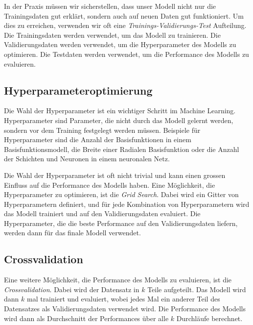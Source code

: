 In der Praxis müssen wir sicherstellen, dass unser Modell nicht nur die Trainingsdaten
gut erklärt, sondern auch auf neuen Daten gut funktioniert.
Um dies zu erreichen, verwenden wir oft eine \emph{Trainings-Validierungs-Test} Aufteilung.
Die Trainingsdaten werden verwendet, um das Modell zu trainieren. Die Validierungsdaten
werden verwendet, um die Hyperparameter des Modells zu optimieren. Die Testdaten werden
verwendet, um die Performance des Modells zu evaluieren.

\subsection{Hyperparameteroptimierung}
Die Wahl der Hyperparameter ist ein wichtiger Schritt im Machine Learning.
Hyperparameter sind Parameter, die nicht durch das Modell gelernt werden, sondern
vor dem Training festgelegt werden müssen. Beispiele für Hyperparameter sind die
Anzahl der Basisfunktionen in einem Basisfunktionsmodell, die Breite einer Radialen 
Basisfunktion oder die Anzahl der Schichten und Neuronen in einem neuronalen Netz.

Die Wahl der Hyperparameter ist oft nicht trivial und kann einen grossen Einfluss auf die
Performance des Modells haben. Eine Möglichkeit, die Hyperparameter zu optimieren, ist
die \emph{Grid Search}. Dabei wird ein Gitter von Hyperparametern definiert, und für
jede Kombination von Hyperparametern wird das Modell trainiert und auf den Validierungsdaten
evaluiert. Die Hyperparameter, die die beste Performance auf den Validierungsdaten liefern,
werden dann für das finale Modell verwendet.

\subsection{Crossvalidation} \label{ML-Crossval}
Eine weitere Möglichkeit, die Performance des Modells zu evaluieren, ist die \emph{Crossvalidation}.
Dabei wird der Datensatz in $k$ Teile aufgeteilt. Das Modell wird dann $k$ mal trainiert und
evaluiert, wobei jedes Mal ein anderer Teil des Datensatzes als Validierungsdaten verwendet wird.
Die Performance des Modells wird dann als Durchschnitt der Performances über alle $k$ Durchläufe
berechnet.

